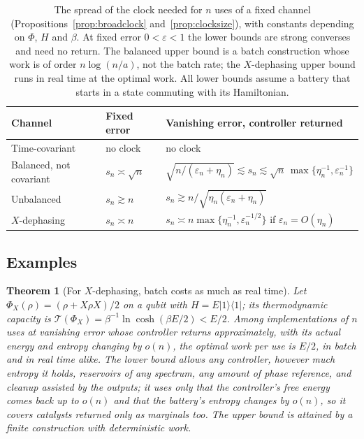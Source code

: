 \documentclass[11pt]{article}
\newtheorem{theorem}{Theorem}
\theoremstyle{definition}
\theoremstyle{remark}
\begin{document}
\begin{table}[ht]
\centering
\small
\begin{tabular}{p{3.0cm}p{2.6cm}p{8.4cm}}
\toprule
Channel & Fixed error & Vanishing error, controller returned\\
\midrule
Time-covariant & no clock & no clock\\
Balanced, not covariant & $s_n\asymp\sqrt n$ & $\sqrt{n/(\varepsilon_n+\eta_n)}\lesssim s_n\lesssim\sqrt n\,\max\{\eta_n^{-1},\varepsilon_n^{-1}\}$\\
Unbalanced & $s_n\gtrsim n$ & $s_n\gtrsim n/\sqrt{\eta_n(\varepsilon_n+\eta_n)}$\\
\quad $X$-dephasing & $s_n\asymp n$ & $s_n\asymp n\max\{\eta_n^{-1},\varepsilon_n^{-1/2}\}$ if $\varepsilon_n=O(\eta_n)$\\
\bottomrule
\end{tabular}
\caption{The spread of the clock needed for $n$ uses of a fixed channel (Propositions~\ref{prop:broadclock} and~\ref{prop:clocksize}), with constants depending on $\Phi$, $H$ and $\beta$. At fixed error $0<\varepsilon<1$ the lower bounds are strong converses and need no return. The balanced upper bound is a batch construction whose work is of order $n\log(n/a)$, not the batch rate; the $X$-dephasing upper bound runs in real time at the optimal work. All lower bounds assume a battery that starts in a state commuting with its Hamiltonian.}\label{tab:clocksize}
\end{table}

\subsection{Examples}

\begin{theorem}[For $X$-dephasing, batch costs as much as real time]\label{thm:batch}
Let $\Phi_X(\rho)=(\rho+X\rho X)/2$ on a qubit with $H=E|1\rangle\langle1|$; its thermodynamic capacity is $\mathcal T(\Phi_X)=\beta^{-1}\ln\cosh(\beta E/2)<E/2$. Among implementations of $n$ uses at vanishing error whose controller returns approximately, with its actual energy and entropy changing by $o(n)$, the optimal work per use is $E/2$, in batch and in real time alike. The lower bound allows any controller, however much entropy it holds, reservoirs of any spectrum, any amount of phase reference, and cleanup assisted by the outputs; it uses only that the controller's free energy comes back up to $o(n)$ and that the battery's entropy changes by $o(n)$, so it covers catalysts returned only as marginals too. The upper bound is attained by a finite construction with deterministic work.
\end{theorem}
\end{document}

